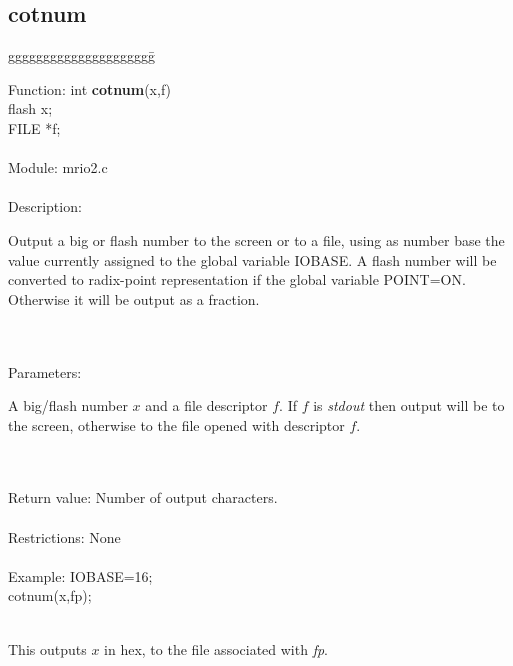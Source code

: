 \pagebreak

\subsection{cotnum}

\begin{tabbing}
ggggggggggggggggggggg\= \kill

      Function:      \>int {\bf cotnum}(x,f)\\
                     \>flash x;  \\
                     \>FILE *f;  \\
      \ \\
      Module:        \>mrio2.c   \\
      \ \\
      Description:   \>
                     \parbox[t]{3in}
                     {Output a big or flash number to the screen or to a file,
                     using as number base the value currently assigned to the
                     global variable IOBASE. A flash number will be converted
                     to radix-point representation if the global variable
                     POINT=ON. Otherwise it will be output as a fraction.}  \\
      \ \\
      Parameters:    \>
                     \parbox[t]{3in}
                     {A big/flash number $x$ and a file descriptor $f$. If $f$ is
                     {\em stdout} then output will be to the screen, otherwise to
                     the file opened with descriptor $f$.}\\
      \ \\                                                    
      Return value:  \>Number of output characters.\\
      \ \\
      Restrictions:  \>None\\
      \ \\
      Example:       \>IOBASE=16;  \\
                     \>cotnum(x,fp);\\
      \ \\
                     \>
                     \parbox[t]{3in}
                     {This outputs $x$ in hex, 
                     to the file associated with {\em fp}.} \\
\end{tabbing}

\pagebreak
